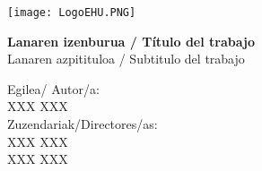 \documentclass[12pt]{article}
\begin{document}

\begin{titlepage}
\hspace*{-3.5cm}
    \begin{minipage}{\textwidth}
        \vspace{-2.5cm}
        \begin{center}
    

            \texttt{[image: LogoEHU.PNG]}
        \end{center}
    \end{minipage}

\vspace{1cm}

\hspace{-3.1cm}
\noindent{}


\vspace{0.8cm}

\noindent\hspace*{-2.5cm}%
\colorbox{light-gray}{\begin{minipage}{\paperwidth}%

    \vspace{1cm}

    \color{RoyalBlue}
    \centering\Large\textbf{ Lanaren izenburua / Título del trabajo}
    \\
    \centering\textmd{ Lanaren azpitituloa / Subtitulo del trabajo}


    \vspace{8cm}\mbox{}
  \end{minipage}
}

\begin{flushright}
 Egilea/ Autor/a:
\\
XXX XXX
\\
Zuzendariak/Directores/as:
\\
XXX XXX
\\
XXX XXX                      
\\
\end{flushright}

\begin{center}
\noindent{}
\end{center}
\end{titlepage}
\end{document}
